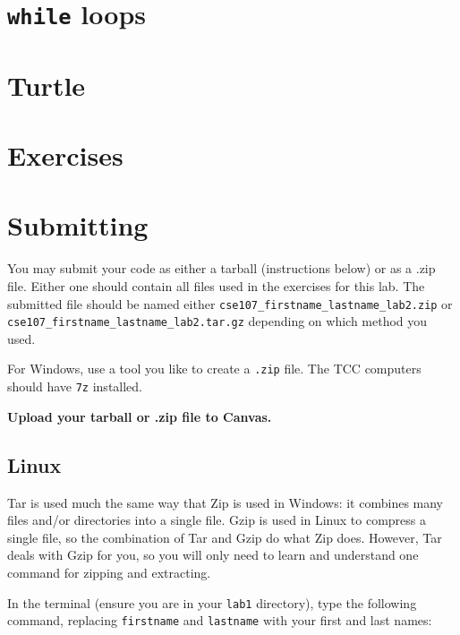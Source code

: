 \documentclass[12pt,hidelinks]{article}
\begin{document}

\section{\texttt{while} loops}

\section{Turtle}

\pagebreak
\section{Exercises}

\pagebreak
\section{Submitting}

You may submit your code as either a tarball (instructions below) or as a .zip
file. Either one should contain all files used in the exercises for this lab.
The submitted file should be named either
\texttt{cse107\_firstname\_lastname\_lab2.zip} or
\texttt{cse107\_firstname\_lastname\_lab2.tar.gz} depending on which method you
used.

For Windows, use a tool you like to create a \texttt{.zip} file. The TCC computers should
have \texttt{7z} installed.

\begin{center}
  \textbf{Upload your tarball or .zip file to Canvas.}
\end{center}

\subsection{Linux}

Tar is used much the same way that Zip is used in Windows: it combines many files and/or directories into a single file. Gzip is used in Linux to compress a single file, so the combination of Tar and Gzip do what Zip does. However, Tar deals with Gzip for you, so you will only need to learn and understand one command for zipping and extracting.

In the terminal (ensure you are in your \texttt{lab1} directory), type the following command, replacing \texttt{firstname} and \texttt{lastname} with your first and last names:
\end{document}

